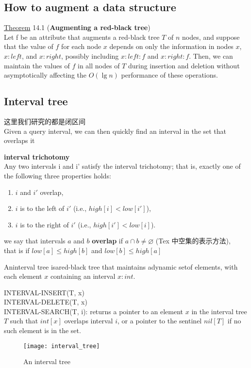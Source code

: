 \documentclass{article}
\begin{document}
\subsection{How to augment a data structure}
\underline{Theorem} 14.1 (\textbf{Augmenting a red-black tree})\\
Let f be an attribute that augments a red-black tree $T$ of $n$ nodes, and suppose that the value of $f$ for each node $x$ depends on only the information in nodes $x$, $x:left$, and $x:right$, possibly including $x:left:f$ and $x:right:f$. Then, we can maintain the values of $f$ in all nodes of $T$ during insertion and deletion without asymptotically affecting the $O(\lg n)$ performance of these operations.

\subsection{Interval tree}
这里我们研究的都是闭区间\\
Given a query interval, we can then quickly find an interval in the set that overlaps it

\textbf{interval trichotomy}\\
Any two intervals i and i' satisfy the interval trichotomy; that is, exactly one of the following three properties holds:
\begin{enumerate}
\item $i$ and $i'$ overlap,
\item $i$ is to the left of $i'$ (i.e., $high[i] < low[i']$),
\item $i$ is to the right of $i'$ (i.e., $high[i'] < low[i]$).
\end{enumerate}

we say that intervals $a$ and $b$ \textbf{overlap} if $a \cap b \neq \varnothing$ (Tex 中空集的表示方法),\\
that is if $low[a] \leq high[b]$ and $low[b] \leq high[a]$

Aninterval tree isared-black tree that maintains adynamic setof elements, with each element $x$ containing an interval $x:int$.

\noindent INTERVAL-INSERT(T, x)\\
INTERVAL-DELETE(T, x)\\
INTERVAL-SEARCH(T, i): returns a pointer to an element $x$ in the interval tree $T$ such that $int[x]$ overlaps interval $i$, or a pointer to the sentinel $nil[T]$ if no such element is in the set.
\begin{figure}[htbp]
  \centering
  \texttt{[image: interval\_tree]}\\
  \caption{An interval tree}\label{fig.interval_tree}
\end{figure}
\end{document}

